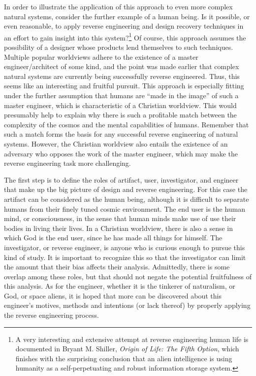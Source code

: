 In order to illustrate the application of this approach to even more
complex natural systems, consider the further example of a human being.
Is it possible, or even reasonable, to apply reverse engineering and
design recovery techniques in an effort to gain insight into this
system?\footnote{
A very interesting and extensive attempt at reverse
engineering human life is documented in Bryant M. Shiller,
\textit{Origin of Life: The Fifth Option},\citep{shiller2004}
which finishes with the surprising conclusion that an alien
intelligence is using humanity as a self-perpetuating and robust
information storage system.
} Of course, this approach assumes the
possibility of a designer whose products lend themselves to such
techniques. Multiple popular worldviews adhere to the existence of a
master engineer/architect of some kind, and the point was made earlier
that complex natural systems are currently being successfully reverse
engineered. Thus, this seems like an interesting and fruitful pursuit.
This approach is especially fitting under the further assumption that
humans are “made in the image” of such a master engineer, which is
characteristic of a Christian worldview. This would presumably help to
explain why there is such a profitable match between the complexity of
the cosmos and the mental capabilities of humans. Remember that such a
match forms the basis for any successful reverse engineering of natural
systems. However, the Christian worldview also entails the existence of
an adversary who opposes the work of the master engineer, which may
make the reverse engineering task more challenging.


The first step is to define the roles of artifact, user, investigator,
and engineer that make up the big picture of design and reverse
engineering. For this case the artifact can be considered as the human
being, although it is difficult to separate humans from their finely
tuned cosmic environment. The end user is the human mind, or
consciousness, in the sense that human minds make use of use their
bodies in living their lives. In a Christian worldview, there is also a
sense in which God is the end user, since he has made all things for
himself. The investigator, or reverse engineer, is anyone who is
curious enough to pursue this kind of study. It is important to
recognize this so that the investigator can limit the amount that their
bias affects their analysis. Admittedly, there is some overlap among
these roles, but that should not negate the potential fruitfulness of
this analysis. As for the engineer, whether it is the tinkerer of
naturalism, or God, or space aliens, it is hoped that more can be
discovered about this engineer’s motives, methods and intentions (or
lack thereof) by properly applying the reverse engineering process. 


